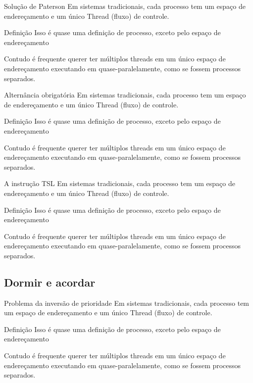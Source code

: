 \documentclass[11pt]{beamer}
\begin{document}

\begin{frame}{Solução de Paterson}
 Em sistemas tradicionais, cada processo tem um espaço de endereçamento e um único Thread (fluxo) de controle.
 \begin{block}{Definição}
 	Isso é quase uma definição de processo, exceto pelo espaço de endereçamento
 \end{block}
 Contudo é frequente querer ter múltiplos threads em um único espaço de endereçamento executando em quase-paralelamente, como se fossem processos separados.
\end{frame}


\begin{frame}{Alternância obrigatória}
 Em sistemas tradicionais, cada processo tem um espaço de endereçamento e um único Thread (fluxo) de controle.
 \begin{block}{Definição}
 	Isso é quase uma definição de processo, exceto pelo espaço de endereçamento
 \end{block}
 Contudo é frequente querer ter múltiplos threads em um único espaço de endereçamento executando em quase-paralelamente, como se fossem processos separados.
\end{frame}


\begin{frame}{A instrução TSL}
 Em sistemas tradicionais, cada processo tem um espaço de endereçamento e um único Thread (fluxo) de controle.
 \begin{block}{Definição}
 	Isso é quase uma definição de processo, exceto pelo espaço de endereçamento
 \end{block}
 Contudo é frequente querer ter múltiplos threads em um único espaço de endereçamento executando em quase-paralelamente, como se fossem processos separados.
\end{frame}


\subsection{Dormir e acordar}

\begin{frame}{Problema da inversão de prioridade}
 Em sistemas tradicionais, cada processo tem um espaço de endereçamento e um único Thread (fluxo) de controle.
 \begin{block}{Definição}
 	Isso é quase uma definição de processo, exceto pelo espaço de endereçamento
 \end{block}
 Contudo é frequente querer ter múltiplos threads em um único espaço de endereçamento executando em quase-paralelamente, como se fossem processos separados.
\end{frame}
\end{document}
